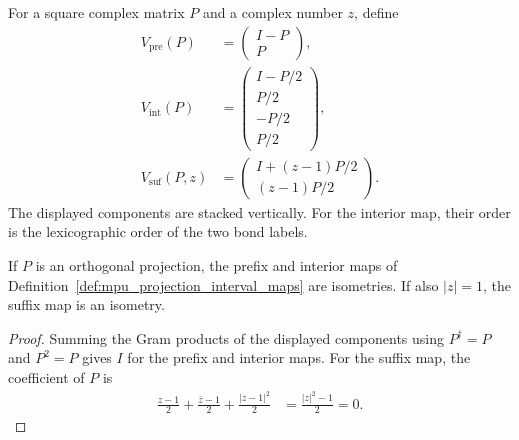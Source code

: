 \begin{definition}
    \label{def:mpu_projection_interval_maps}
    \leanok
    For a square complex matrix $P$ and a complex number $z$, define
    \begin{align}
        V_{\mathrm{pre}}(P)   & =\begin{pmatrix}I-P\\P\end{pmatrix},                \\
        V_{\mathrm{int}}(P)   & =\begin{pmatrix}I-P/2\\P/2\\-P/2\\P/2\end{pmatrix}, \\
        V_{\mathrm{suf}}(P,z) & =\begin{pmatrix}I+(z-1)P/2\\(z-1)P/2\end{pmatrix}.
    \end{align}
    The displayed components are stacked vertically. For the interior map,
    their order is the lexicographic order of the two bond labels.
\end{definition}

\begin{lemma}
    \label{thm:mpu_projection_interval_isometries}
    \leanok
    If $P$ is an orthogonal projection, the prefix and interior maps of
    Definition~\ref{def:mpu_projection_interval_maps} are isometries.
    If also $|z|=1$, the suffix map is an isometry.
\end{lemma}

\begin{proof}\leanok
    Summing the Gram products of the displayed components using
    $P^\dagger=P$ and $P^2=P$ gives $I$ for the prefix and interior maps.
    For the suffix map, the coefficient of $P$ is
    \begin{align}
        \frac{z-1}{2}+\frac{\bar z-1}{2}+\frac{|z-1|^2}{2}
         & =\frac{|z|^2-1}{2}=0.
    \end{align}
\end{proof}

